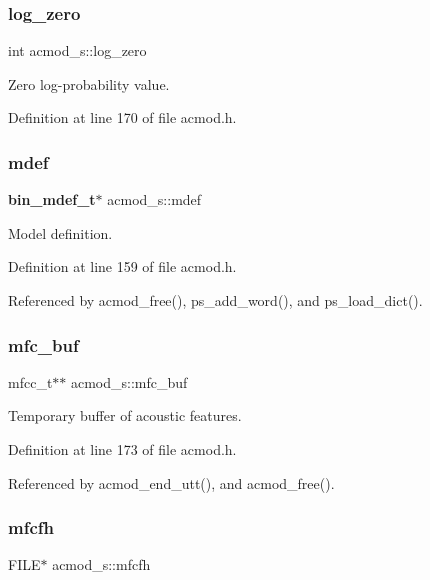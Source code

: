 \subsubsection{log\+\_\+zero}
{\footnotesize\ttfamily int acmod\+\_\+s\+::log\+\_\+zero}



Zero log-\/probability value. 



Definition at line 170 of file acmod.\+h.

\mbox{\label{structacmod__s_a351548ff5547c29b4a684e10434a51dd}} 
\subsubsection{mdef}
{\footnotesize\ttfamily \textbf{ bin\+\_\+mdef\+\_\+t}$\ast$ acmod\+\_\+s\+::mdef}



Model definition. 



Definition at line 159 of file acmod.\+h.



Referenced by acmod\+\_\+free(), ps\+\_\+add\+\_\+word(), and ps\+\_\+load\+\_\+dict().

\mbox{\label{structacmod__s_a5ded3dce0428a6ecba97b5d3486e7fa9}} 
\subsubsection{mfc\+\_\+buf}
{\footnotesize\ttfamily mfcc\+\_\+t$\ast$$\ast$ acmod\+\_\+s\+::mfc\+\_\+buf}



Temporary buffer of acoustic features. 



Definition at line 173 of file acmod.\+h.



Referenced by acmod\+\_\+end\+\_\+utt(), and acmod\+\_\+free().

\mbox{\label{structacmod__s_a71903df6839f1f9fcfc2ef2a62a94f8e}} 
\subsubsection{mfcfh}
{\footnotesize\ttfamily F\+I\+LE$\ast$ acmod\+\_\+s\+::mfcfh}



